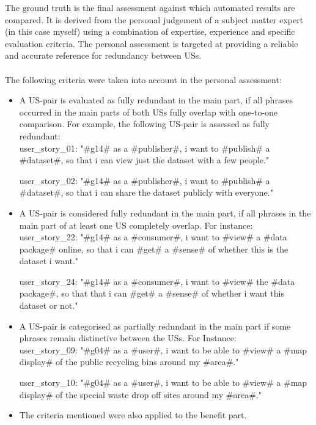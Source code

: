 The ground truth is the final assessment against which automated results are compared. It is derived from the personal judgement of a subject matter expert (in this case myself) using a combination of expertise, experience and specific evaluation criteria. The personal assessment is targeted at providing a reliable and accurate reference for redundancy between USs.\\\\
	The following criteria were taken into account in the personal assessment:
	\begin{itemize}
		\item A US-pair is evaluated as fully redundant in the main part, if all phrases occurred in the main parts of both USs fully overlap with one-to-one comparison. For example, the following US-pair is assessed as fully redundant:\\
		user\_story\_01: "\#g14\# as a \#publisher\#, i want to \#publish\# a \#dataset\#, so that i can view just the dataset with a few people."
		
		user\_story\_02: "\#g14\# as a \#publisher\#, i want to \#publish\# a \#dataset\#, so that i can share the dataset publicly with everyone."
		
		\item A US-pair is considered fully redundant in the main part, if all phrases in the main part of at least one US completely overlap. For instance:\\
		user\_story\_22: "\#g14\# as a \#consumer\#, i want to \#view\# a \#data package\# online, so that i can \#get\# a \#sense\# of whether this is the dataset i want."
		
		user\_story\_24: "\#g14\# as a \#consumer\#, i want to \#view\# the \#data package\#, so that that i can \#get\# a \#sense\# of whether i want this dataset or not."
		
		\item A US-pair is categorised as partially redundant in the main part if some phrases remain distinctive between the USs. For Instance:\\
		user\_story\_09: "\#g04\# as a \#user\#, i want to be able to \#view\# a \#map display\# of the public recycling bins around my \#area\#."
		
		user\_story\_10: "\#g04\# as a \#user\#, i want to be able to \#view\# a \#map display\# of the special waste drop off sites around my \#area\#."
		
		\item The criteria mentioned were also applied to the benefit part.
	\end{itemize}
